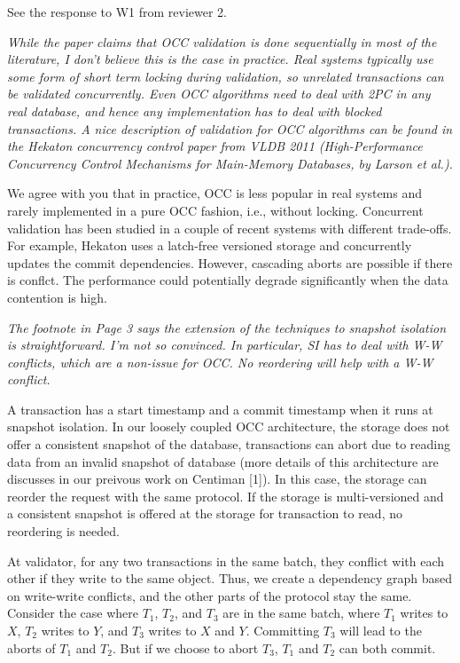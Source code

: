 \documentclass{article}
\begin{document}
See the response to W1 from reviewer 2.

\emph{While the paper claims that OCC validation is done sequentially in most of the literature, I don't believe this is the case in practice. Real systems typically use some form of short term locking during validation, so unrelated transactions can be validated concurrently. Even OCC algorithms need to deal with 2PC in any real database, and hence any implementation has to deal with blocked transactions. A nice description of validation for OCC algorithms can be found in the Hekaton concurrency control paper from VLDB 2011 (High-Performance Concurrency Control Mechanisms for Main-Memory Databases, by Larson et al.). }

We agree with you that in practice, OCC is less popular in real systems and rarely implemented in a pure OCC fashion, i.e., without locking. Concurrent validation has been studied in a couple of recent systems with different trade-offs. For example, Hekaton uses a latch-free versioned storage and concurrently updates the commit dependencies. However, cascading aborts are possible if there is conflct. The performance could potentially degrade significantly when the data contention is high.

\emph{The footnote in Page 3 says the extension of the techniques to snapshot isolation is straightforward. I'm not so convinced. In particular, SI has to deal with W-W conflicts, which are a non-issue for OCC. No reordering will help with a W-W conflict.
}

A transaction has a start timestamp and a commit timestamp when it runs at snapshot isolation. In our loosely coupled OCC architecture, the storage does not offer a consistent snapshot of the database, transactions can abort due to reading data from an invalid snapshot of database (more details of this architecture are discusses in our preivous work on Centiman [1]). In this case, the storage can reorder the request with the same protocol. If the storage is multi-versioned and a consistent snapshot is offered at the storage for transaction to read, no reordering is needed.

At validator, for any two transactions in the same batch, they conflict with each other if they write to the same object. Thus, we create a dependency graph based on write-write conflicts, and the other parts of the protocol stay the same. Consider the case where $T_1$, $T_2$, and $T_3$ are in the same batch, where $T_1$ writes to $X$, $T_2$ writes to $Y$, and $T_3$ writes to $X$ and $Y$. Committing $T_3$ will lead to the aborts of $T_1$ and $T_2$. But if we choose to abort $T_3$, $T_1$ and $T_2$ can both commit.
\end{document}
